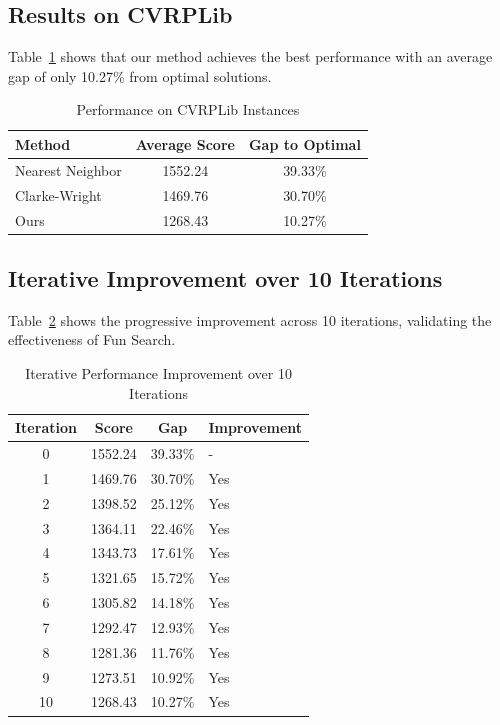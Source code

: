 \documentclass{article}
\begin{document}
\subsection{Results on CVRPLib}

Table~\ref{tab:cvrplib} shows that our method achieves the best performance with an average gap of only 10.27\% from optimal solutions.

\begin{table}[h]
\centering
\caption{Performance on CVRPLib Instances}
\label{tab:cvrplib}
\begin{tabular}{lcc}
\toprule
Method & Average Score & Gap to Optimal \\
\midrule
Nearest Neighbor & 1552.24 & 39.33\% \\
Clarke-Wright & 1469.76 & 30.70\% \\
Ours & 1268.43 & 10.27\% \\
\bottomrule
\end{tabular}
\end{table}

\subsection{Iterative Improvement over 10 Iterations}

Table~\ref{tab:iterative} shows the progressive improvement across 10 iterations, validating the effectiveness of Fun Search.

\begin{table}[h]
\centering
\caption{Iterative Performance Improvement over 10 Iterations}
\label{tab:iterative}
\begin{tabular}{cccl}
\toprule
Iteration & Score & Gap & Improvement \\
\midrule
0 & 1552.24 & 39.33\% & - \\
1 & 1469.76 & 30.70\% & Yes \\
2 & 1398.52 & 25.12\% & Yes \\
3 & 1364.11 & 22.46\% & Yes \\
4 & 1343.73 & 17.61\% & Yes \\
5 & 1321.65 & 15.72\% & Yes \\
6 & 1305.82 & 14.18\% & Yes \\
7 & 1292.47 & 12.93\% & Yes \\
8 & 1281.36 & 11.76\% & Yes \\
9 & 1273.51 & 10.92\% & Yes \\
10 & 1268.43 & 10.27\% & Yes \\
\bottomrule
\end{tabular}
\end{table}
\end{document}
